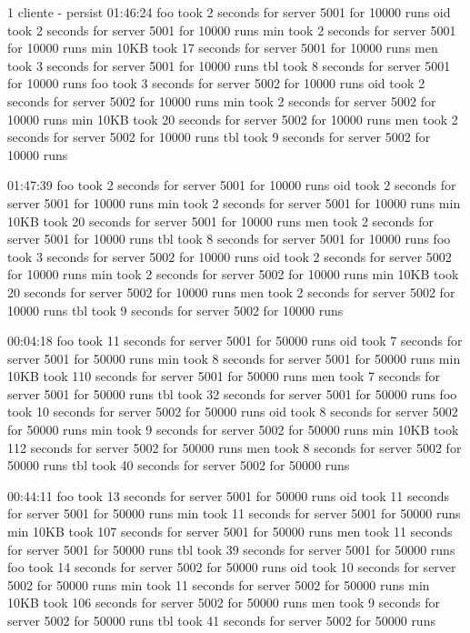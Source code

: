 \documentclass[11pt]{article}
\begin{document}
 1 cliente - persist
01:46:24
foo took 2 seconds for server 5001 for 10000 runs
oid took 2 seconds for server 5001 for 10000 runs
min took 2 seconds for server 5001 for 10000 runs
min 10KB took 17 seconds for server 5001 for 10000 runs
men took 3 seconds for server 5001 for 10000 runs
tbl took 8 seconds for server 5001 for 10000 runs
foo took 3 seconds for server 5002 for 10000 runs
oid took 2 seconds for server 5002 for 10000 runs
min took 2 seconds for server 5002 for 10000 runs
min 10KB took 20 seconds for server 5002 for 10000 runs
men took 2 seconds for server 5002 for 10000 runs
tbl took 9 seconds for server 5002 for 10000 runs

01:47:39
foo took 2 seconds for server 5001 for 10000 runs
oid took 2 seconds for server 5001 for 10000 runs
min took 2 seconds for server 5001 for 10000 runs
min 10KB took 20 seconds for server 5001 for 10000 runs
men took 2 seconds for server 5001 for 10000 runs
tbl took 8 seconds for server 5001 for 10000 runs
foo took 3 seconds for server 5002 for 10000 runs
oid took 2 seconds for server 5002 for 10000 runs
min took 2 seconds for server 5002 for 10000 runs
min 10KB took 20 seconds for server 5002 for 10000 runs
men took 2 seconds for server 5002 for 10000 runs
tbl took 9 seconds for server 5002 for 10000 runs


00:04:18
foo took 11 seconds for server 5001 for 50000 runs
oid took 7 seconds for server 5001 for 50000 runs
min took 8 seconds for server 5001 for 50000 runs
min 10KB took 110 seconds for server 5001 for 50000 runs
men took 7 seconds for server 5001 for 50000 runs
tbl took 32 seconds for server 5001 for 50000 runs
foo took 10 seconds for server 5002 for 50000 runs
oid took 8 seconds for server 5002 for 50000 runs
min took 9 seconds for server 5002 for 50000 runs
min 10KB took 112 seconds for server 5002 for 50000 runs
men took 8 seconds for server 5002 for 50000 runs
tbl took 40 seconds for server 5002 for 50000 runs

00:44:11
foo took 13 seconds for server 5001 for 50000 runs
oid took 11 seconds for server 5001 for 50000 runs
min took 11 seconds for server 5001 for 50000 runs
min 10KB took 107 seconds for server 5001 for 50000 runs
men took 11 seconds for server 5001 for 50000 runs
tbl took 39 seconds for server 5001 for 50000 runs
foo took 14 seconds for server 5002 for 50000 runs
oid took 10 seconds for server 5002 for 50000 runs
min took 11 seconds for server 5002 for 50000 runs
min 10KB took 106 seconds for server 5002 for 50000 runs
men took 9 seconds for server 5002 for 50000 runs
tbl took 41 seconds for server 5002 for 50000 runs
\end{document}
